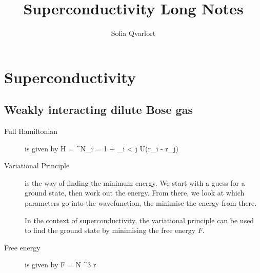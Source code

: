 


\title{Superconductivity Long Notes}
\author{Sofia Qvarfort}
\maketitle

\section{Superconductivity}
\subsection{Weakly interacting dilute Bose gas}
\begin{description}
\item[Full Hamiltonian] is given by 
\beq
H = \sum^N_{i = 1}  + \sum_{i < j} U\delta (r_i - r_j) 
\eeq

\item[Variational Principle] is the way of finding the minimum energy. We start with a guess for a ground state, then work out the energy. From there, we look at which parameters go into the wavefunction, the minimise the energy from there. 

In the context of superconductivity, the variational principle can be used to find the ground state by minimising the free energy $F$. 

\item[Free energy] is given by
\beq
F = N \int  \intd^3 r 
\eeq

\end{description}
